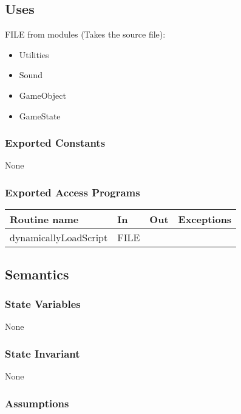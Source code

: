 \documentclass[12pt]{article}
\begin{document}
\subsection*{Uses}

FILE from modules (Takes the source file):
\begin{itemize}
  \item Utilities\\
  \item Sound\\
  \item GameObject\\
  \item GameState\\
\end{itemize}

\subsubsection*{Exported Constants}

None

\subsubsection*{Exported Access Programs}

\begin{tabular}{| l | l | l | l |}
    \hline
    \textbf{Routine name} & \textbf{In} & \textbf{Out} & \textbf{Exceptions}\\
    \hline
    dynamicallyLoadScript & FILE & ~ & ~\\
    \hline

\end{tabular}

\subsection* {Semantics}

\subsubsection* {State Variables}

None

\subsubsection* {State Invariant}

None

\subsubsection* {Assumptions}
\end{document}

